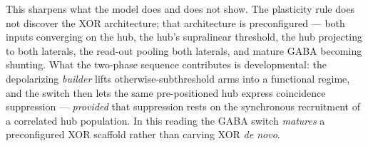 This sharpens what the model does and does not show. The plasticity rule does not discover the
XOR architecture; that architecture is preconfigured --- both inputs converging on the hub, the
hub's supralinear threshold, the hub projecting to both laterals, the read-out pooling both
laterals, and mature GABA becoming shunting. What the two-phase sequence contributes is
developmental: the depolarizing \emph{builder} lifts otherwise-subthreshold arms into a
functional regime, and the switch then lets the same pre-positioned hub express coincidence
suppression --- \emph{provided} that suppression rests on the synchronous recruitment of a
correlated hub population. In this reading the GABA switch \emph{matures} a preconfigured
XOR scaffold rather than carving XOR \emph{de novo}.
